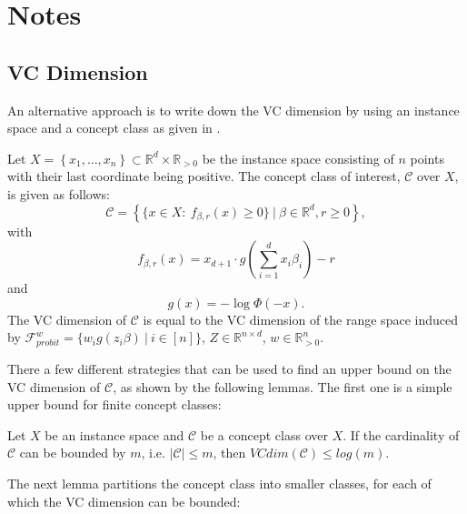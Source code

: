 \section{Notes}

\newpage

\subsection{VC Dimension}

An alternative approach is to write down the VC dimension by using
an instance space and a concept class as given
in \cite{computational-learning-theory}.

\begin{lemma}
    Let $X = \left\{ x_1, ..., x_n \right\} \subset \mathbb{R}^d \times \mathbb{R}_{>0}$
    be the instance space consisting of $n$ points with their last
    coordinate being positive.
    The concept class of interest, $\mathcal{C}$ over $X$, is given as follows:
    \begin{equation*}
        \mathcal{C} = \left\{ \{x \in X:\ f_{\beta, r}(x) \geq 0 \} \ |\ \beta \in \mathbb{R}^d, r \geq 0 \right\},
    \end{equation*}
    with
    \begin{equation*}
        f_{\beta, r}(x) = x_{d+1} \cdot g\left(\sum_{i=1}^d x_i \beta_i\right) - r
    \end{equation*}
    and
    \begin{equation*}
        g(x) = -\log \Phi(-x).
    \end{equation*}
    The VC dimension of $\mathcal{C}$ is equal to the VC dimension of the
    range space induced by
    $\mathcal{F}^w_{probit} = \{ w_i g(z_i \beta) \ | \ i \in [n] \}$,
    $Z \in \mathbb{R}^{n \times d}$, $w \in \mathbb{R}^n_{>0}$.
\end{lemma}

There a few different strategies that can be used to find an upper
bound on the VC dimension of $\mathcal{C}$, as shown by the following
lemmas.
The first one is a simple upper bound for finite concept classes:

\begin{lemma}
    Let $X$ be an instance space and $\mathcal{C}$ be a concept class
    over $X$.
    If the cardinality of $\mathcal{C}$ can be bounded by $m$, i.e.
    $|\mathcal{C}| \leq m$, then $VCdim(\mathcal{C}) \leq log(m)$.
\end{lemma}

The next lemma partitions the concept class into smaller classes,
for each of which the VC dimension can be bounded:

